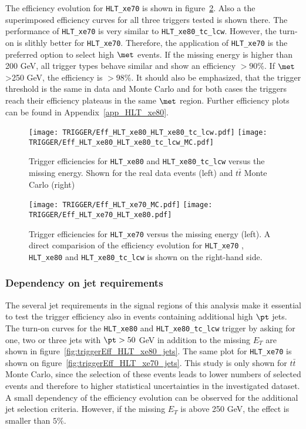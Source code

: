 The efficiency evolution for \texttt{HLT\_xe70}  is shown in figure~\ref{fig:triggerEff_HLT_xe70}. Also a the superimposed efficiency curves for all three triggers tested is shown there. The performance of  \texttt{HLT\_xe70} is very similar to \texttt{HLT\_xe80\_tc\_lcw}. However, the turn-on is slithly better for \texttt{HLT\_xe70}. Therefore, the application of \texttt{HLT\_xe70} is the preferred option to select high $\met$ events. If the missing energy is higher than 200 GeV, all trigger types behave similar and show an efficiency  $>90\%$. If $\met$>250 GeV, the efficiency is $>98\%$. It should also be emphasized, that the trigger threshold is the same in data and Monte Carlo and for both cases the triggers reach their efficiency plateaus in the same $\met$ region. Further efficiency plots can be found in Appendix~\ref{app_HLT_xe80}.

\begin{figure}[htb!]
\centering
\texttt{[image: TRIGGER/Eff\_HLT\_xe80\_HLT\_xe80\_tc\_lcw.pdf]}
\texttt{[image: TRIGGER/Eff\_HLT\_xe80\_HLT\_xe80\_tc\_lcw\_MC.pdf]}
\caption{Trigger efficiencies for \texttt{HLT\_xe80} and \texttt{HLT\_xe80\_tc\_lcw} versus the missing energy. Shown for the real data events (left) and $t\bar{t}$ Monte Carlo (right)}
\label{fig:triggerEff_HLT_xe80}
\end{figure}

\begin{figure}[htb!]
\centering
\texttt{[image: TRIGGER/Eff\_HLT\_xe70\_MC.pdf]}
\texttt{[image: TRIGGER/Eff\_HLT\_xe70\_HLT\_xe80.pdf]}
\caption{Trigger efficiencies for \texttt{HLT\_xe70}  versus the missing energy (left). A direct comparision of the efficiency evolution for \texttt{HLT\_xe70} , \texttt{HLT\_xe80} and \texttt{HLT\_xe80\_tc\_lcw} is shown on the right-hand side.  }
\label{fig:triggerEff_HLT_xe70}
\end{figure}


\subsubsection{Dependency on jet requirements}

The several jet requirements in the signal regions of this analysis make it essential to test the trigger efficiency also in events containing additional high $\pt$ jets. The turn-on curves for the  \texttt{HLT\_xe80} and \texttt{HLT\_xe80\_tc\_lcw} trigger by asking for one, two or three jets with $\pt > 50$ GeV in addition to the missing $E_T$ are shown in figure~\ref{fig:triggerEff_HLT_xe80_jets}. The same plot for \texttt{HLT\_xe70} is shown on figure~\ref{fig:triggerEff_HLT_xe70_jets}. This study is only shown for $t\bar{t}$ Monte Carlo, since the selection of these events leads to lower numbers of selected events and therefore to higher statistical uncertainties in the investigated dataset. A small dependency of the efficiency evolution can be observed for the additional jet selection criteria. However, if the missing $E_T$ is above 250 GeV, the effect is smaller than $5\%$.


